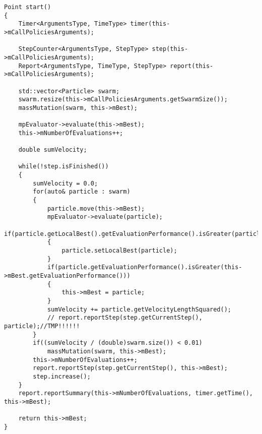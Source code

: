 \begin{lstlisting}
Point start()
{
    Timer<ArgumentsType, TimeType> timer(this->mCallPoliciesArguments);

    StepCounter<ArgumentsType, StepType> step(this->mCallPoliciesArguments);
    Report<ArgumentsType, TimeType, StepType> report(this->mCallPoliciesArguments);

    std::vector<Particle> swarm;
    swarm.resize(this->mCallPoliciesArguments.getSwarmSize());
    massMutation(swarm, this->mBest);

    mpEvaluator->evaluate(this->mBest);
    this->mNumberOfEvaluations++;

    double sumVelocity;

    while(!step.isFinished())
    {
        sumVelocity = 0.0;
        for(auto& particle : swarm)
        {
            particle.move(this->mBest);
            mpEvaluator->evaluate(particle);
            if(particle.getLocalBest().getEvaluationPerformance().isGreater(particle.getEvaluationPerformance()))
            {
                particle.setLocalBest(particle);
            }
            if(particle.getEvaluationPerformance().isGreater(this->mBest.getEvaluationPerformance()))
            {
                this->mBest = particle;
            }
            sumVelocity += particle.getVelocityLengthSquared();
            // report.reportStep(step.getCurrentStep(), particle);//TMP!!!!!!
        }
        if((sumVelocity / (double)swarm.size()) < 0.01)
            massMutation(swarm, this->mBest);
        this->mNumberOfEvaluations++;
        report.reportStep(step.getCurrentStep(), this->mBest);
        step.increase();
    }
    report.reportSummary(this->mNumberOfEvaluations, timer.getTime(), this->mBest);

    return this->mBest;
}
\end{lstlisting}




